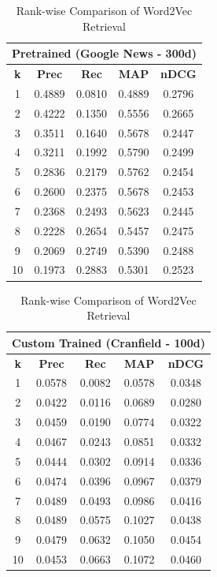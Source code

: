 \begin{table}[H]
\centering
\small
\begin{minipage}{0.48\textwidth}
\centering
\begin{tabular}{|c|ccc|c|}
\hline
\multicolumn{5}{|c|}{\textbf{Pretrained (Google News - 300d)}} \\ \hline
\textbf{k} & \textbf{Prec} & \textbf{Rec} & \textbf{MAP} & \textbf{nDCG} \\ \hline
1  & 0.4889 & 0.0810 & 0.4889 & 0.2796 \\
2  & 0.4222 & 0.1350 & 0.5556 & 0.2665 \\
3  & 0.3511 & 0.1640 & 0.5678 & 0.2447 \\
4  & 0.3211 & 0.1992 & 0.5790 & 0.2499 \\
5  & 0.2836 & 0.2179 & 0.5762 & 0.2454 \\
6  & 0.2600 & 0.2375 & 0.5678 & 0.2453 \\
7  & 0.2368 & 0.2493 & 0.5623 & 0.2445 \\
8  & 0.2228 & 0.2654 & 0.5457 & 0.2475 \\
9  & 0.2069 & 0.2749 & 0.5390 & 0.2488 \\
10 & 0.1973 & 0.2883 & 0.5301 & 0.2523 \\ \hline
\end{tabular}
\end{minipage}
\hfill
\begin{minipage}{0.48\textwidth}
\centering
\begin{tabular}{|c|ccc|c|}
\hline
\multicolumn{5}{|c|}{\textbf{Custom Trained (Cranfield - 100d)}} \\ \hline
\textbf{k} & \textbf{Prec} & \textbf{Rec} & \textbf{MAP} & \textbf{nDCG} \\ \hline
1  & 0.0578 & 0.0082 & 0.0578 & 0.0348 \\
2  & 0.0422 & 0.0116 & 0.0689 & 0.0280 \\
3  & 0.0459 & 0.0190 & 0.0774 & 0.0322 \\
4  & 0.0467 & 0.0243 & 0.0851 & 0.0332 \\
5  & 0.0444 & 0.0302 & 0.0914 & 0.0336 \\
6  & 0.0474 & 0.0396 & 0.0967 & 0.0379 \\
7  & 0.0489 & 0.0493 & 0.0986 & 0.0416 \\
8  & 0.0489 & 0.0575 & 0.1027 & 0.0438 \\
9  & 0.0479 & 0.0632 & 0.1050 & 0.0454 \\
10 & 0.0453 & 0.0663 & 0.1072 & 0.0460 \\ \hline
\end{tabular}
\end{minipage}
\caption{Rank-wise Comparison of Word2Vec Retrieval}
\end{table}

